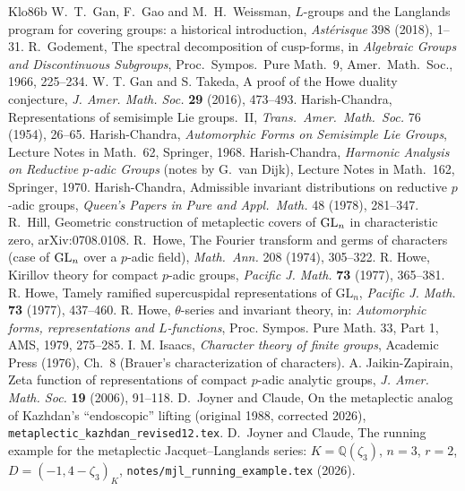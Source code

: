 \begin{thebibliography}{Klo86b}
 W.~T.~Gan, F.~Gao and M.~H.~Weissman, $L$-groups and the Langlands program for covering groups: a historical introduction, \emph{Ast\'erisque} 398 (2018), 1--31.
 R.~Godement, The spectral decomposition of cusp-forms, in \emph{Algebraic Groups and Discontinuous Subgroups}, Proc.\ Sympos.\ Pure Math.\ 9, Amer.\ Math.\ Soc., 1966, 225--234.
 W. T. Gan and S. Takeda, A proof of the Howe duality conjecture, \emph{J. Amer. Math. Soc.} \textbf{29} (2016), 473--493.
 Harish-Chandra, Representations of semisimple Lie groups.\ II, \emph{Trans.\ Amer.\ Math.\ Soc.} 76 (1954), 26--65.
 Harish-Chandra, \emph{Automorphic Forms on Semisimple Lie Groups}, Lecture Notes in Math.\ 62, Springer, 1968.
 Harish-Chandra, \emph{Harmonic Analysis on Reductive $p$-adic Groups} (notes by G.~van Dijk), Lecture Notes in Math.\ 162, Springer, 1970.
 Harish-Chandra, Admissible invariant distributions on reductive $p$-adic groups, \emph{Queen's Papers in Pure and Appl.\ Math.} 48 (1978), 281--347.
 R.~Hill, Geometric construction of metaplectic covers of $\mathrm{GL}_n$ in characteristic zero, arXiv:0708.0108.
 R.~Howe, The Fourier transform and germs of characters (case of $\mathrm{GL}_n$ over a $p$-adic field), \emph{Math.\ Ann.} 208 (1974), 305--322.
 R. Howe, Kirillov theory for compact $p$-adic groups, \emph{Pacific J. Math.} \textbf{73} (1977), 365--381.
 R. Howe, Tamely ramified supercuspidal representations of $\mathrm{GL}_n$, \emph{Pacific J. Math.} \textbf{73} (1977), 437--460.
 R. Howe, $\theta$-series and invariant theory, in: \emph{Automorphic forms, representations and $L$-functions}, Proc. Sympos. Pure Math. 33, Part 1, AMS, 1979, 275--285.
 I. M. Isaacs, \emph{Character theory of finite groups}, Academic Press (1976), Ch.~8 (Brauer's characterization of characters).
 A. Jaikin-Zapirain, Zeta function of representations of compact $p$-adic analytic groups, \emph{J. Amer. Math. Soc.} \textbf{19} (2006), 91--118.
 D.~Joyner and Claude, On the metaplectic analog of Kazhdan's ``endoscopic'' lifting (original 1988, corrected 2026), \texttt{metaplectic\_kazhdan\_revised12.tex}.
 D.~Joyner and Claude, The running example for the metaplectic Jacquet--Langlands series: $K=\mathbb Q(\zeta_3)$, $n=3$, $r=2$, $D=(-1,4-\zeta_3)_K$, \texttt{notes/mjl\_running\_example.tex} (2026).

\end{thebibliography}
